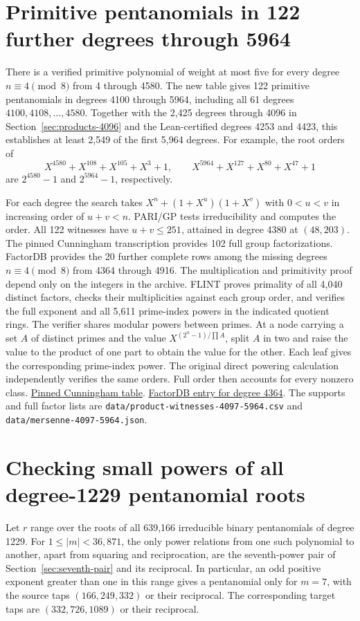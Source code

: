 \documentclass[11pt]{article}
\begin{document}
\section{Primitive pentanomials in 122 further degrees through 5964}
\label{sec:products-5964}
There is a verified primitive polynomial of weight at most five for every
degree \(n\equiv4\pmod8\) from 4 through 4580. The new table gives
122 primitive pentanomials in degrees 4100 through 5964, including all
61 degrees \(4100,4108,\ldots,4580\). Together with the 2,425
degrees through 4096 in Section~\ref{sec:products-4096} and the
Lean-certified degrees 4253 and 4423, this establishes at least
2,549 of the first 5,964 degrees. For example, the root orders of
\[
  X^{4580}+X^{108}+X^{105}+X^3+1,\qquad
  X^{5964}+X^{127}+X^{80}+X^{47}+1
\]
are \(2^{4580}-1\) and \(2^{5964}-1\), respectively.

For each degree the search takes \(X^n+(1+X^u)(1+X^v)\) with
\(0<u<v\) in increasing order of \(u+v<n\). PARI/GP tests
irreducibility and computes the order. All 122 witnesses have
\(u+v\le251\), attained in degree 4380 at \((48,203)\).
The pinned Cunningham transcription provides 102 full group
factorizations. FactorDB provides the 20 further complete rows
among the missing degrees \(n\equiv4\pmod8\) from 4364 through 4916.
The multiplication and primitivity proof depend only on the integers
in the archive. FLINT proves primality of all 4,040 distinct factors,
checks their multiplicities against each group order, and verifies
the full exponent and all 5,611 prime-index powers in the indicated
quotient rings. The verifier shares modular powers between primes. At a node carrying a set \(A\) of distinct primes and the value
\(X^{(2^n-1)/\prod A}\), split \(A\) in two and raise the value to
the product of one part to obtain the value for the other. Each leaf
gives the corresponding prime-index power. The original direct
powering calculation independently verifies the same orders.
Full order then accounts for every nonzero class.
\href{https://github.com/postvakje/Reformatted-Cunningham-Project-tables/blob/dff2e282ff15399b16b4fb840a410aa2a37076b7/pmain422_table2-.json}{Pinned Cunningham table}.
\href{https://factordb.com/index.php?query=2\%5E4364-1}{FactorDB entry for degree 4364}.
The supports and full factor lists are
\nolinkurl{data/product-witnesses-4097-5964.csv} and
\nolinkurl{data/mersenne-4097-5964.json}.

\section{Checking small powers of all degree-1229 pentanomial roots}
\label{sec:1229-power-transfers}
Let \(r\) range over the roots of all 639,166 irreducible binary
pentanomials of degree 1229. For \(1\le |m|<36{,}871\), the only
power relations from one such polynomial to another, apart from
squaring and reciprocation, are the seventh-power pair of
Section~\ref{sec:seventh-pair} and its reciprocal.
In particular, an odd positive exponent greater than one in this range
gives a pentanomial only for \(m=7\), with the source taps
\((166,249,332)\) or their reciprocal. The corresponding target taps
are \((332,726,1089)\) or their reciprocal.
\end{document}
